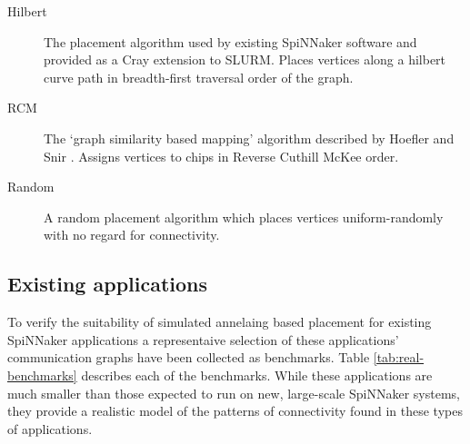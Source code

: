 			\begin{description}
				
				\item[Hilbert] The placement algorithm used by existing SpiNNaker
				software and provided as a Cray extension to SLURM. Places vertices
				along a hilbert curve path in breadth-first traversal order of the
				graph.
				
				\item[RCM] The `graph similarity based mapping' algorithm described by
				Hoefler and Snir \cite{hoefler11}. Assigns vertices to chips in Reverse
				Cuthill McKee order.
				
				\item[Random] A random placement algorithm which places vertices
				uniform-randomly with no regard for connectivity.
				
			\end{description}
			
		\subsection{Existing applications}
			
			To verify the suitability of simulated annelaing based placement for
			existing SpiNNaker applications a representaive selection of these
			applications' communication graphs have been collected as benchmarks.
			Table \ref{tab:real-benchmarks} describes each of the benchmarks.  While
			these applications are much smaller than those expected to run on new,
			large-scale SpiNNaker systems, they provide a realistic model of the
			patterns of connectivity found in these types of applications.
			
